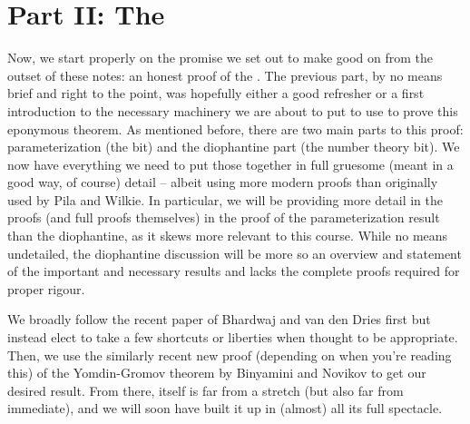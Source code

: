% 
%
%

\section{Part II: The \pwT}

\noindent Now, we start properly on the promise we set out to make good on from the outset of these notes: an honest proof of the \pwt. The previous part, by no means brief and right to the point, was hopefully either a good refresher or a first introduction to the necessary machinery we are about to put to use to prove this eponymous theorem. As mentioned before, there are two main parts to this proof: parameterization (the \om bit) and the diophantine part (the number theory bit). We now have everything we need to put those together in full gruesome (meant in a good way, of course) detail -- albeit using more modern proofs than originally used by Pila and Wilkie. In particular, we will be providing more detail in the proofs (and full proofs themselves) in the proof of the parameterization result than the diophantine, as it skews more relevant to this course. While no means undetailed, the diophantine discussion will be more so an overview and statement of the important and necessary results and lacks the complete proofs required for proper rigour.

We broadly follow the recent paper of Bhardwaj and van den Dries \cite{bhardwaj_pilawilkie_2022} first but instead elect to take a few shortcuts or liberties when thought to be appropriate. Then, we use the similarly recent new proof (depending on when you're reading this) of the Yomdin-Gromov theorem by Binyamini and Novikov \cite{binyamini_yomdingromov_2021} to get our desired result. From there, \pw itself is far from a stretch (but also far from immediate), and we will soon have built it up in (almost) all its full spectacle.
